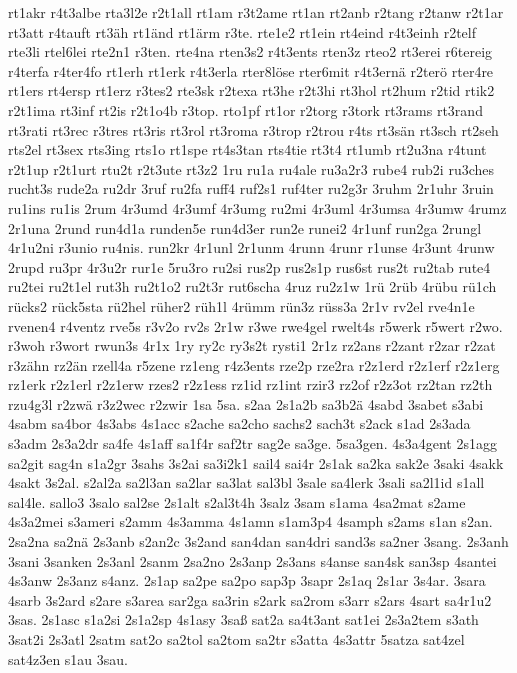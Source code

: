 {rt1akr
r4t3albe
rta3l2e
r2t1all
rt1am
r3t2ame
rt1an
rt2anb
r2tang
r2tanw
r2t1ar
rt3att
r4tauft
rt3äh
rt1änd
rt1ärm
r3te.
rte1e2
rt1ein
rt4eind
r4t3einh
r2telf
rte3li
rtel6lei
rte2n1
r3ten.
rte4na
rten3s2
r4t3ents
rten3z
rteo2
rt3erei
r6tereig
r4terfa
r4ter4fo
rt1erh
rt1erk
r4t3erla
rter8löse
rter6mit
r4t3ernä
r2terö
rter4re
rt1ers
rt4ersp
rt1erz
r3tes2
rte3sk
r2texa
rt3he
r2t3hi
rt3hol
rt2hum
r2tid
rtik2
r2t1ima
rt3inf
rt2is
r2t1o4b
r3top.
rto1pf
rt1or
r2torg
r3tork
rt3rams
rt3rand
rt3rati
rt3rec
r3tres
rt3ris
rt3rol
rt3roma
r3trop
r2trou
r4ts
rt3sän
rt3sch
rt2seh
rts2el
rt3sex
rts3ing
rts1o
rt1spe
rt4s3tan
rts4tie
rt3t4
rt1umb
rt2u3na
r4tunt
r2t1up
r2t1urt
rtu2t
r2t3ute
rt3z2
1ru
ru1a
ru4ale
ru3a2r3
rube4
rub2i
ru3ches
rucht3s
rude2a
ru2dr
3ruf
ru2fa
ruff4
ruf2s1
ruf4ter
ru2g3r
3ruhm
2r1uhr
3ruin
ru1ins
ru1is
2rum
4r3umd
4r3umf
4r3umg
ru2mi
4r3uml
4r3umsa
4r3umw
4rumz
2r1una
2rund
run4d1a
runden5e
run4d3er
run2e
runei2
4r1unf
run2ga
2rungl
4r1u2ni
r3unio
ru4nis.
run2kr
4r1unl
2r1unm
4runn
4runr
r1unse
4r3unt
4runw
2rupd
ru3pr
4r3u2r
rur1e
5ru3ro
ru2si
rus2p
rus2s1p
rus6st
rus2t
ru2tab
rute4
ru2tei
ru2t1el
rut3h
ru2t1o2
ru2t3r
rut6scha
4ruz
ru2z1w
1rü
2rüb
4rübu
rü1ch
rücks2
rück5sta
rü2hel
rüher2
rüh1l
4rümm
rün3z
rüss3a
2r1v
rv2el
rve4n1e
rvenen4
r4ventz
rve5s
r3v2o
rv2s
2r1w
r3we
rwe4gel
rwelt4s
r5werk
r5wert
r2wo.
r3woh
r3wort
rwun3s
4r1x
1ry
ry2c
ry3s2t
rysti1
2r1z
rz2ans
r2zant
r2zar
r2zat
r3zähn
rz2än
rzell4a
r5zene
rz1eng
r4z3ents
rze2p
rze2ra
r2z1erd
r2z1erf
r2z1erg
rz1erk
r2z1erl
r2z1erw
rzes2
r2z1ess
rz1id
rz1int
rzir3
rz2of
r2z3ot
rz2tan
rz2th
rzu4g3l
r2zwä
r3z2wec
r2zwir
1sa
5sa.
s2aa
2s1a2b
sa3b2ä
4sabd
3sabet
s3abi
4sabm
sa4bor
4s3abs
4s1acc
s2ache
sa2cho
sachs2
sach3t
s2ack
s1ad
2s3ada
s3adm
2s3a2dr
sa4fe
4s1aff
sa1f4r
saf2tr
sag2e
sa3ge.
5sa3gen.
4s3a4gent
2s1agg
sa2git
sag4n
s1a2gr
3sahs
3s2ai
sa3i2k1
sail4
sai4r
2s1ak
sa2ka
sak2e
3saki
4sakk
4sakt
3s2al.
s2al2a
sa2l3an
sa2lar
sa3lat
sal3bl
3sale
sa4lerk
3sali
sa2l1id
s1all
sal4le.
sallo3
3salo
sal2se
2s1alt
s2al3t4h
3salz
3sam
s1ama
4sa2mat
s2ame
4s3a2mei
s3ameri
s2amm
4s3amma
4s1amn
s1am3p4
4samph
s2ams
s1an
s2an.
2sa2na
sa2nä
2s3anb
s2an2c
3s2and
san4dan
san4dri
sand3s
sa2ner
3sang.
2s3anh
3sani
3sanken
2s3anl
2sanm
2sa2no
2s3anp
2s3ans
s4anse
san4sk
san3sp
4santei
4s3anw
2s3anz
s4anz.
2s1ap
sa2pe
sa2po
sap3p
3sapr
2s1aq
2s1ar
3s4ar.
3sara
4sarb
3s2ard
s2are
s3area
sar2ga
sa3rin
s2ark
sa2rom
s3arr
s2ars
4sart
sa4r1u2
3sas.
2s1asc
s1a2si
2s1a2sp
4s1asy
3saß
sat2a
sa4t3ant
sat1ei
2s3a2tem
s3ath
3sat2i
2s3atl
2satm
sat2o
sa2tol
sa2tom
sa2tr
s3atta
4s3attr
5satza
sat4zel
sat4z3en
s1au
3sau.
}
